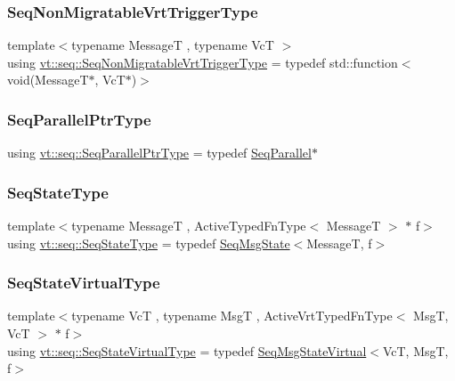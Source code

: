 \subsubsection{\texorpdfstring{Seq\+Non\+Migratable\+Vrt\+Trigger\+Type}{SeqNonMigratableVrtTriggerType}}
{\footnotesize\ttfamily template$<$typename MessageT , typename VcT $>$ \\
using \hyperlink{namespacevt_1_1seq_a73ba0745e730a1837e22d831390d92e0}{vt\+::seq\+::\+Seq\+Non\+Migratable\+Vrt\+Trigger\+Type} = typedef std\+::function$<$void(MessageT$\ast$, VcT$\ast$)$>$}

\mbox{\label{namespacevt_1_1seq_a050106112a0717f8e482465957fb2bfe}} 
\subsubsection{\texorpdfstring{Seq\+Parallel\+Ptr\+Type}{SeqParallelPtrType}}
{\footnotesize\ttfamily using \hyperlink{namespacevt_1_1seq_a050106112a0717f8e482465957fb2bfe}{vt\+::seq\+::\+Seq\+Parallel\+Ptr\+Type} = typedef \hyperlink{structvt_1_1seq_1_1_seq_parallel}{Seq\+Parallel}$\ast$}

\mbox{\label{namespacevt_1_1seq_a61d50713160a2f94f2f2b22eb68eb12e}} 
\subsubsection{\texorpdfstring{Seq\+State\+Type}{SeqStateType}}
{\footnotesize\ttfamily template$<$typename MessageT , Active\+Typed\+Fn\+Type$<$ Message\+T $>$ $\ast$ f$>$ \\
using \hyperlink{namespacevt_1_1seq_a61d50713160a2f94f2f2b22eb68eb12e}{vt\+::seq\+::\+Seq\+State\+Type} = typedef \hyperlink{structvt_1_1seq_1_1_seq_msg_state}{Seq\+Msg\+State}$<$MessageT, f$>$}

\mbox{\label{namespacevt_1_1seq_a724782ea7be9de5901b428738083ea51}} 
\subsubsection{\texorpdfstring{Seq\+State\+Virtual\+Type}{SeqStateVirtualType}}
{\footnotesize\ttfamily template$<$typename VcT , typename MsgT , Active\+Vrt\+Typed\+Fn\+Type$<$ Msg\+T, Vc\+T $>$ $\ast$ f$>$ \\
using \hyperlink{namespacevt_1_1seq_a724782ea7be9de5901b428738083ea51}{vt\+::seq\+::\+Seq\+State\+Virtual\+Type} = typedef \hyperlink{structvt_1_1seq_1_1_seq_msg_state_virtual}{Seq\+Msg\+State\+Virtual}$<$VcT, MsgT, f$>$}

